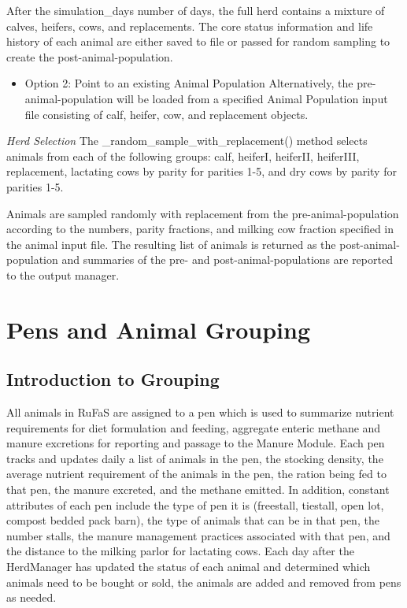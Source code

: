 \documentclass[
  letterpaper,
  oneside,
  openany]{scrbook}
\providecommand{\tightlist}{%
  \setlength{\itemsep}{0pt}\setlength{\parskip}{0pt}}
\begin{document}
After the simulation\_days number of days, the full herd contains a
mixture of calves, heifers, cows, and replacements. The core status
information and life history of each animal are either saved to file or
passed for random sampling to create the post-animal-population.

\begin{itemize}
\tightlist
\item
  Option 2: Point to an existing Animal Population Alternatively, the
  pre-animal-population will be loaded from a specified Animal
  Population input file consisting of calf, heifer, cow, and replacement
  objects.
\end{itemize}

\emph{Herd Selection} The \_random\_sample\_with\_replacement() method
selects animals from each of the following groups: calf, heiferI,
heiferII, heiferIII, replacement, lactating cows by parity for parities
1-5, and dry cows by parity for parities 1-5.

Animals are sampled randomly with replacement from the
pre-animal-population according to the numbers, parity fractions, and
milking cow fraction specified in the animal input file. The resulting
list of animals is returned as the post-animal-population and summaries
of the pre- and post-animal-populations are reported to the output
manager.

\section{Pens and Animal Grouping}\label{pens-and-animal-grouping}

\subsection{Introduction to Grouping}\label{introduction-to-grouping}

All animals in RuFaS are assigned to a pen which is used to summarize
nutrient requirements for diet formulation and feeding, aggregate
enteric methane and manure excretions for reporting and passage to the
Manure Module. Each pen tracks and updates daily a list of animals in
the pen, the stocking density, the average nutrient requirement of the
animals in the pen, the ration being fed to that pen, the manure
excreted, and the methane emitted. In addition, constant attributes of
each pen include the type of pen it is (freestall, tiestall, open lot,
compost bedded pack barn), the type of animals that can be in that pen,
the number stalls, the manure management practices associated with that
pen, and the distance to the milking parlor for lactating cows. Each day
after the HerdManager has updated the status of each animal and
determined which animals need to be bought or sold, the animals are
added and removed from pens as needed.
\end{document}
